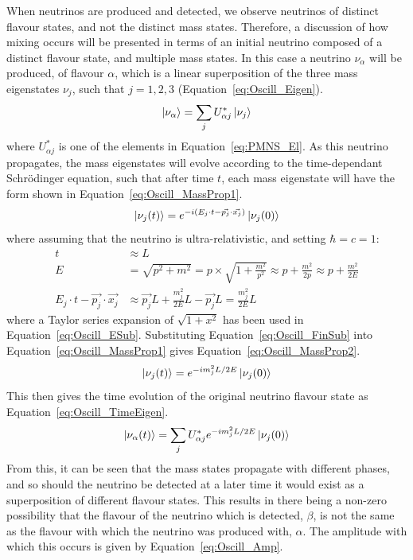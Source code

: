 When neutrinos are produced and detected, we observe neutrinos of distinct flavour states, and not the distinct mass states. Therefore, a discussion of how mixing occurs will be presented in terms of an initial neutrino composed of a distinct flavour state, and multiple mass states. In this case a neutrino $\nu_\alpha$ will be produced, of flavour $\alpha$, which is a linear superposition of the three mass eigenstates $\nu_j$, such that $j=1,2,3$ (Equation~\ref{eq:Oscill_Eigen}). 
\begin{equation}
  \label{eq:Oscill_Eigen}
  \ket{\nu_\alpha} = \sum_{j}U^{\ast}_{\alpha j}\ket{\nu_j}
\end{equation}
where $U^{\ast}_{\alpha j}$ is one of the elements in Equation~\ref{eq:PMNS_El}. As this neutrino propagates, the mass eigenstates will evolve according to the time-dependant Schr\"{o}dinger equation, such that after time $t$, each mass eigenstate will have the form shown in Equation~\ref{eq:Oscill_MassProp1}.
\begin{equation}
  \label{eq:Oscill_MassProp1}
  \ket{\nu_j(t)} = e^{-i(E_{j}\cdot t - \vec{p_{j}}\cdot\vec{x_{j}})}\ket{\nu_j(0)}
\end{equation}
where assuming that the neutrino is ultra-relativistic, and setting $\hbar=c=1$:
\begin{align}
  t &\approx L \label{eq:Oscill_t2L} \\
  E &= \sqrt{p^2+m^2} = p \times \sqrt{1+\frac{m^2}{p^2}} \approx p + \frac{m^2}{2p} \approx p + \frac{m^2}{2E} \label{eq:Oscill_ESub} \\
  E_{j}\cdot t - \vec{p_{j}}\cdot\vec{x_{j}} &\approx \vec{p_{j}}L + \frac{m_{j}^2}{2E}L - \vec{p_{j}}L = \frac{m_{j}^2}{2E}L \label{eq:Oscill_FinSub}  
\end{align}
where a Taylor series expansion of $\sqrt{1+x^2}$ has been used in Equation~\ref{eq:Oscill_ESub}. Substituting Equation~\ref{eq:Oscill_FinSub} into Equation~\ref{eq:Oscill_MassProp1} gives Equation~\ref{eq:Oscill_MassProp2}.
\begin{equation}
  \label{eq:Oscill_MassProp2}
  \ket{\nu_j(t)} = e^{-im_{j}^{2}L/2E}\ket{\nu_j(0)}
\end{equation}
This then gives the time evolution of the original neutrino flavour state as Equation~\ref{eq:Oscill_TimeEigen}.
\begin{equation}
  \label{eq:Oscill_TimeEigen}
  \ket{\nu_\alpha(t)} = \sum_{j}U^{\ast}_{\alpha j}e^{-im_{j}^{2}L/2E}\ket{\nu_j(0)}
\end{equation}
From this, it can be seen that the mass states propagate with different phases, and so should the neutrino be detected at a later time it would exist as a superposition of different flavour states. This results in there being a non-zero possibility that the flavour of the neutrino which is detected, $\beta$, is not the same as the flavour with which the neutrino was produced with, $\alpha$. The amplitude with which this occurs is given by Equation~\ref{eq:Oscill_Amp}.
